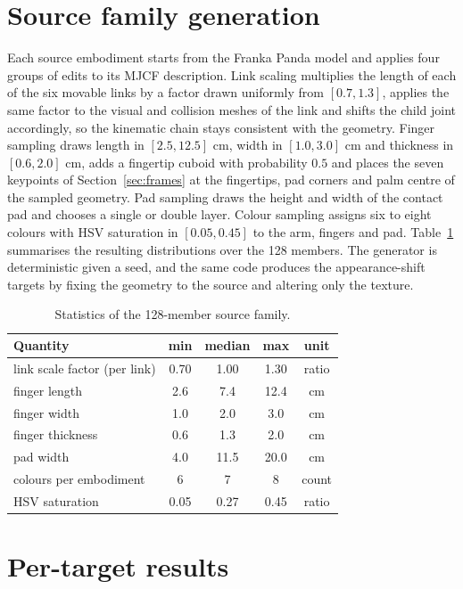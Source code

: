 \appendix

\section{Source family generation}
\label{app:family}

Each source embodiment starts from the Franka Panda model and applies four groups of edits to its MJCF description. Link scaling multiplies the length of each of the six movable links by a factor drawn uniformly from $[0.7, 1.3]$, applies the same factor to the visual and collision meshes of the link and shifts the child joint accordingly, so the kinematic chain stays consistent with the geometry. Finger sampling draws length in $[2.5, 12.5]$ cm, width in $[1.0, 3.0]$ cm and thickness in $[0.6, 2.0]$ cm, adds a fingertip cuboid with probability $0.5$ and places the seven keypoints of Section~\ref{sec:frames} at the fingertips, pad corners and palm centre of the sampled geometry. Pad sampling draws the height and width of the contact pad and chooses a single or double layer. Colour sampling assigns six to eight colours with HSV saturation in $[0.05, 0.45]$ to the arm, fingers and pad. Table~\ref{tab:family} summarises the resulting distributions over the 128 members. The generator is deterministic given a seed, and the same code produces the appearance-shift targets by fixing the geometry to the source and altering only the texture.

\begin{table}[h]
\centering
\caption{Statistics of the 128-member source family.}
\label{tab:family}
\small
\begin{tabular}{lcccc}
\toprule
Quantity & min & median & max & unit \\
\midrule
link scale factor (per link) & 0.70 & 1.00 & 1.30 & ratio \\
finger length & 2.6 & 7.4 & 12.4 & cm \\
finger width & 1.0 & 2.0 & 3.0 & cm \\
finger thickness & 0.6 & 1.3 & 2.0 & cm \\
pad width & 4.0 & 11.5 & 20.0 & cm \\
colours per embodiment & 6 & 7 & 8 & count \\
HSV saturation & 0.05 & 0.27 & 0.45 & ratio \\
\bottomrule
\end{tabular}
\end{table}

\section{Per-target results}
\label{app:pertarget}


